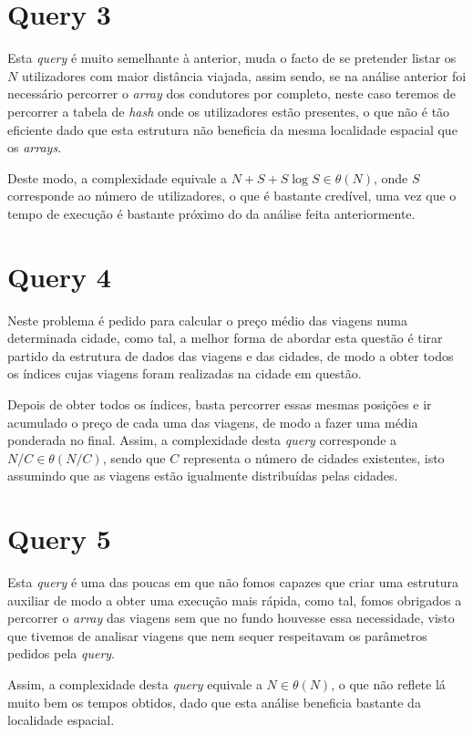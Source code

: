 \documentclass[12pt,a4paper]{report}
\begin{document}
\section{Query 3}

Esta \textit{query} é muito semelhante à anterior, muda o facto de se pretender listar os \(N\) utilizadores com maior distância viajada, assim sendo, se na análise anterior foi necessário percorrer o \textit{array} dos condutores por completo, neste caso teremos de percorrer a tabela de \textit{hash} onde os utilizadores estão presentes, o que não é tão eficiente dado que esta estrutura não beneficia da mesma localidade espacial que os \textit{arrays}.

Deste modo, a complexidade equivale a \(N + S + S\log S\in\theta(N)\), onde \(S\) corresponde ao número de utilizadores, o que é bastante credível, uma vez que o tempo de execução é bastante próximo do da análise feita anteriormente.

\section{Query 4}

Neste problema é pedido para calcular o preço médio das viagens numa determinada cidade, como tal, a melhor forma de abordar esta questão é tirar partido da estrutura de dados das viagens e das cidades, de modo a obter todos os índices cujas viagens foram realizadas na cidade em questão.

Depois de obter todos os índices, basta percorrer essas mesmas posições e ir acumulado o preço de cada uma das viagens, de modo a fazer uma média ponderada no final. Assim, a complexidade desta \textit{query} corresponde a \(N/C \in\theta(N/C)\), sendo que \(C\) representa o número de cidades existentes, isto assumindo que as viagens estão igualmente distribuídas pelas cidades.

\section{Query 5}

Esta \textit{query} é uma das poucas em que não fomos capazes que criar uma estrutura auxiliar de modo a obter uma execução mais rápida, como tal, fomos obrigados a percorrer o \textit{array} das viagens sem que no fundo houvesse essa necessidade, visto que tivemos de analisar viagens que nem sequer respeitavam os parâmetros pedidos pela \textit{query}.

Assim, a complexidade desta \textit{query} equivale a \(N \in \theta(N)\), o que não reflete lá muito bem os tempos obtidos, dado que esta análise beneficia bastante da localidade espacial.
\end{document}
